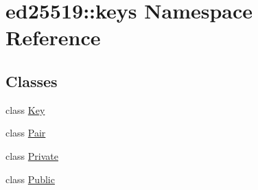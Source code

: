 \hypertarget{namespaceed25519_1_1keys}{}\section{ed25519\+::keys Namespace Reference}
\label{namespaceed25519_1_1keys}
\subsection*{Classes}
\begin{DoxyCompactItemize}
\item 
class \mbox{\hyperlink{classed25519_1_1keys_1_1_key}{Key}}
\item 
class \mbox{\hyperlink{classed25519_1_1keys_1_1_pair}{Pair}}
\item 
class \mbox{\hyperlink{classed25519_1_1keys_1_1_private}{Private}}
\item 
class \mbox{\hyperlink{classed25519_1_1keys_1_1_public}{Public}}
\end{DoxyCompactItemize}
